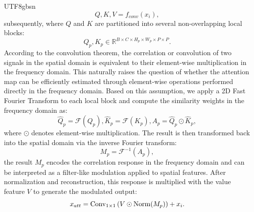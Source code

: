 \documentclass[times, review, 10pt]{elsarticle}
\begin{document}
\begin{CJK}{UTF8}{gbsn}
\begin{equation}
Q,K,V=f_{conv}\left(x_i\right),
\end{equation}
subsequently, where $Q$ and $K$ are partitioned into several non-overlapping local blocks:
\begin{equation}
Q_p,K_p\in\mathbb{R}^{B\times C\times H_p\times W_p\times P\times P}.
\end{equation}
According to the convolution theorem, the correlation or convolution of two signals in the spatial domain is equivalent to their element-wise multiplication in the frequency domain. This naturally raises the question of whether the attention map can be efficiently estimated through element-wise operations performed directly in the frequency domain. Based on this assumption, we apply a 2D Fast Fourier Transform to each local block and compute the similarity weights in the frequency domain as:
\begin{equation}
\hat{Q}_p=\mathcal{F}(Q_p),\hat{K}_p=\mathcal{F}(K_p),A_p=\hat{Q}_p\odot\hat{K}_p,
\end{equation}
where $\odot$ denotes element-wise multiplication. The result is then transformed back into the spatial domain via the inverse Fourier transform:
\begin{equation}
M_p=\mathcal{F}^{-1}(A_p),
\end{equation}
the result $M_p$ encodes the correlation response in the frequency domain and can be interpreted as a filter-like modulation applied to spatial features. After normalization and reconstruction, this response is multiplied with the value feature $V$ to generate the modulated output:
\begin{equation}
x_{att}={\rm Conv}_{1\times1}\left(V\odot {\rm Norm}(M_p)\right)+x_i.
\end{equation}
\par

\end{CJK}
\end{document}
